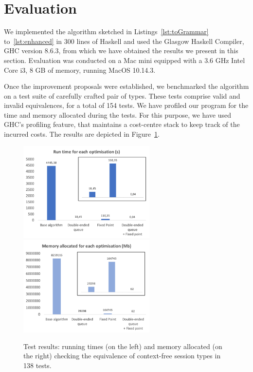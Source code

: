 \section{Evaluation}
\label{sec:evaluation}


We implemented the algorithm sketched in Listings~\ref{lst:toGrammar}
to~\ref{lst:enhanced} in 300 lines of Haskell and used the Glasgow
Haskell Compiler, GHC version 8.6.3, from which we have obtained the
results we present in this section.  Evaluation was conducted on a Mac
mini equipped with a 3.6 GHz Intel Core i3, 8 GB of memory, running
MacOS 10.14.3.

Once the improvement proposals were established, we benchmarked the
algorithm on a test suite of carefully crafted pair of types. These
tests comprise valid and invalid equivalences, for a total of 154
tests. We have profiled our program for the time and memory allocated
during the tests. For this purpose, we have used GHC's profiling
feature, that maintains a cost-centre stack to keep track of the
incurred costs. The results are depicted in
Figure~\ref{fig:results}.

\begin{figure}[h]
	\includegraphics[height=5cm]{img/run_time}	\enspace
	\includegraphics[height=5cm]{img/memory_alloc}
	\caption{Test results: running times (on the left) and
	memory allocated (on the right) checking the equivalence
	of context-free session types in 138 tests.}
	\label{fig:results}
\end{figure}

